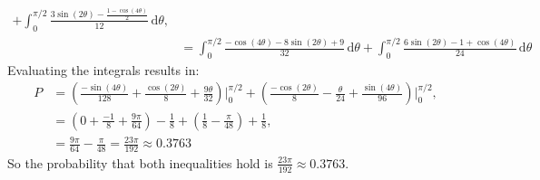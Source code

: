 \documentclass[11pt]{article}
\newcommand{\dd}{\,\mathrm{d}}
\begin{document}
\begin{enumerate}[label=(\alph*)]
\begin{align}
      + \int_0^{\pi/2}\frac{3\sin(2\theta) - \frac{1-\cos(4\theta)}{2}}{12}\dd\theta, \\
    &= \int_0^{\pi/2}\frac{-\cos(4\theta) - 8\sin(2\theta) + 9}{32}\dd\theta
      + \int_0^{\pi/2}\frac{6\sin(2\theta) - 1 + \cos(4\theta)}{24}\dd\theta
  \end{align}
  Evaluating the integrals results in:
  \begin{align}
    P &= \left(\frac{-\sin(4\theta)}{128} + \frac{\cos(2\theta)}{8} + \frac{9\theta}{32}\right)\Bigg|_0^{\pi/2}
      + \left(\frac{-\cos(2\theta)}{8} - \frac{\theta}{24} + \frac{\sin(4\theta)}{96}\right)\Bigg|_0^{\pi/2}, \\
    &= \left(0 + \frac{-1}{8} + \frac{9\pi}{64}\right) - \frac{1}{8}
      + \left(\frac{1}{8} - \frac{\pi}{48}\right) + \frac{1}{8}, \\
    &= \frac{9\pi}{64} - \frac{\pi}{48} = \frac{23\pi}{192} \approx \num{0.3763}
  \end{align}
  So the probability that both inequalities hold is $\tfrac{23\pi}{192} \approx \num{0.3763}$.
\end{enumerate}
\end{document}
